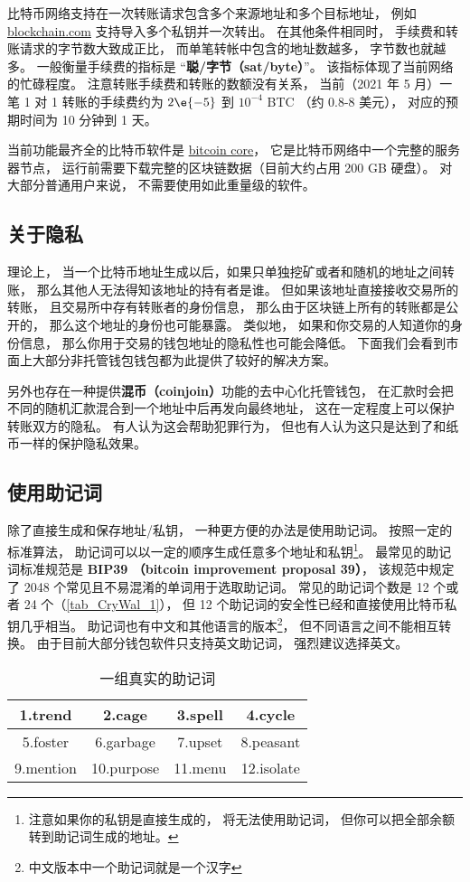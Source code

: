 比特币网络支持在一次转账请求包含多个来源地址和多个目标地址， 例如 \href{https://blockchain.com}{blockchain.com} 支持导入多个私钥并一次转出。 在其他条件相同时， 手续费和转账请求的字节数大致成正比， 而单笔转帐中包含的地址数越多， 字节数也就越多。 一般衡量手续费的指标是 “\textbf{聪/字节（sat/byte）}”。 该指标体现了当前网络的忙碌程度。 注意转账手续费和转账的数额没有关系， 当前（2021 年 5 月）一笔 1 对 1 转账的手续费约为 $2\e{-5}$ 到 $10^{-4}$ BTC （约 0.8-8 美元）， 对应的预期时间为 10 分钟到 1 天。

当前功能最齐全的比特币软件是 \href{https://bitcoin.org/en/bitcoin-core/}{bitcoin core}， 它是比特币网络中一个完整的服务器节点， 运行前需要下载完整的区块链数据（目前大约占用 200 GB 硬盘）。 对大部分普通用户来说， 不需要使用如此重量级的软件。

\subsection{关于隐私}
理论上， 当一个比特币地址生成以后，如果只单独挖矿或者和随机的地址之间转账， 那么其他人无法得知该地址的持有者是谁。 但如果该地址直接接收交易所的转账， 且交易所中存有转账者的身份信息， 那么由于区块链上所有的转账都是公开的， 那么这个地址的身份也可能暴露。 类似地， 如果和你交易的人知道你的身份信息， 那么你用于交易的钱包地址的隐私性也可能会降低。 下面我们会看到市面上大部分非托管钱包钱包都为此提供了较好的解决方案。

另外也存在一种提供\textbf{混币（coinjoin）}功能的去中心化托管钱包， 在汇款时会把不同的随机汇款混合到一个地址中后再发向最终地址， 这在一定程度上可以保护转账双方的隐私。 有人认为这会帮助犯罪行为， 但也有人认为这只是达到了和纸币一样的保护隐私效果。

\subsection{使用助记词}
除了直接生成和保存地址/私钥， 一种更方便的办法是使用助记词。 按照一定的标准算法， 助记词可以以一定的顺序生成任意多个地址和私钥\footnote{注意如果你的私钥是直接生成的， 将无法使用助记词， 但你可以把全部余额转到助记词生成的地址。}。 最常见的助记词标准规范是 \textbf{BIP39 （bitcoin improvement proposal 39）}， 该规范中规定了 2048 个常见且不易混淆的单词用于选取助记词。 常见的助记词个数是 12 个或者 24 个（\autoref{tab_CryWal_1}）， 但 12 个助记词的安全性已经和直接使用比特币私钥几乎相当。 助记词也有中文和其他语言的版本\footnote{中文版本中一个助记词就是一个汉字}， 但不同语言之间不能相互转换。 由于目前大部分钱包软件只支持英文助记词， 强烈建议选择英文。
\begin{table}[ht]
\centering
\caption{一组真实的助记词}\label{tab_CryWal_1}
\begin{tabular}{|c|c|c|c|}
\hline
1.trend & 2.cage & 3.spell & 4.cycle \\
\hline
5.foster & 6.garbage & 7.upset & 8.peasant \\
\hline
9.mention & 10.purpose & 11.menu & 12.isolate \\
\hline
\end{tabular}
\end{table}


